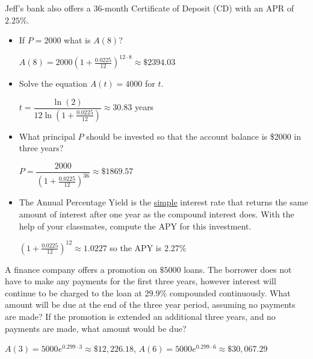 \documentclass{ximera}
\begin{document}
\begin{problem}
 Jeff's bank also offers a 36-month Certificate of Deposit (CD) with an APR of $2.25\%$.


\begin{itemize}
    \item If $P = 2000$ what is $A(8)$?

\begin{solution}
    $A(8) = 2000\left(1 + \frac{0.0225}{12}\right)^{12 \cdot 8} \approx \$2394.03$
\end{solution}
    
\item
     Solve the equation $A(t) = 4000$ for $t$.

\begin{solution}
    $t = \dfrac{\ln(2)}{12 \ln\left(1 + \frac{0.0225}{12}\right)} \approx 30.83$ years
\end{solution}
     
\item
    What principal $P$ should be invested so that the account balance is \$2000 in three years?

\begin{solution}
    $P = \dfrac{2000}{\left(1 + \frac{0.0225}{12}\right)^{36}} \approx \$1869.57$
\end{solution}

\item 
    The Annual Percentage Yield is the \underline{simple} interest rate that returns the same amount of interest after one year as the compound interest does.  With the help of your classmates, compute the APY for this investment.

\begin{solution}
    $\left(1 + \frac{0.0225}{12}\right)^{12} \approx 1.0227$ so the APY is 2.27\%
\end{solution}

\end{itemize}

\end{problem}

\begin{problem}
    A finance company offers a promotion on $\$5000$ loans.  The borrower does not have to make any payments for the first three years, however interest will continue to be charged to the loan at $29.9 \%$ compounded continuously.  What amount will be due at the end of the three year period, assuming no payments are made?  If the promotion is extended an additional three years, and no payments are made, what amount would be due?

\begin{solution}
    $A(3) = 5000e^{0.299 \cdot 3} \approx \$12,226.18$,  $A(6) = 5000e^{0.299 \cdot 6} \approx \$30,067.29$
\end{solution}
    
\end{problem}
\end{document}
